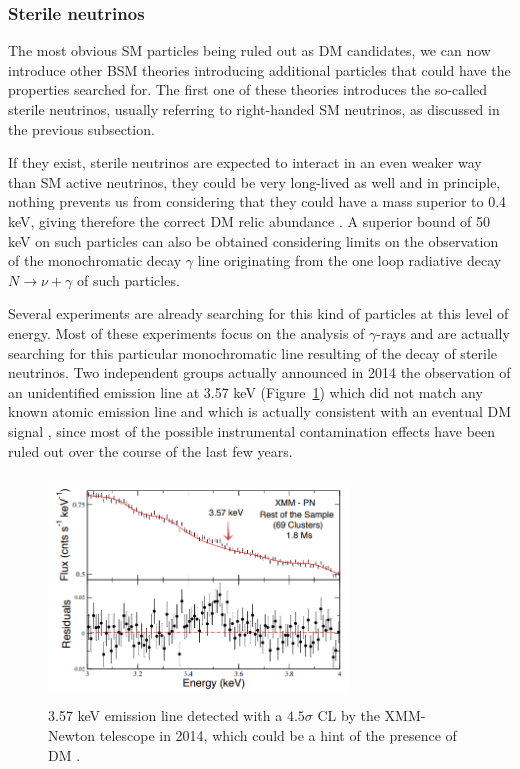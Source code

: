 \documentclass[a4paper, 10pt, openright]{report}
\begin{document}
\subsubsection*{Sterile neutrinos}
The most obvious \ac{SM} particles being ruled out as \ac{DM} candidates, we can now introduce other \ac{BSM} theories introducing additional particles that could have the properties searched for. The first one of these theories introduces the so-called sterile neutrinos, usually referring to right-handed \ac{SM} neutrinos, as discussed in the previous subsection. 

If they exist, sterile neutrinos are expected to interact in an even weaker way than \ac{SM} active neutrinos, they could be very long-lived as well and in principle, nothing prevents us from considering that they could have a mass superior to 0.4 keV, giving therefore the correct \ac{DM} relic abundance \cite{keVSterile}. A superior bound of 50 keV on such particles can also be obtained considering limits on the observation of the monochromatic decay $\gamma$ line originating from the one loop radiative decay $N \rightarrow \nu + \gamma$ of such particles.

Several experiments are already searching for this kind of particles at this level of energy. Most of these experiments focus on the analysis of $\gamma$-rays and are actually searching for this particular monochromatic line resulting of the decay of sterile neutrinos. Two independent groups actually announced in 2014 the observation of an unidentified emission line at 3.57 keV (Figure~\ref{fig:DMDetection}) which did not match any known atomic emission line and which is actually consistent with an eventual \ac{DM} signal \cite{DMDetection1, DMDetection2}, since most of the possible instrumental contamination effects have been ruled out over the course of the last few years.

\begin{figure}[htbp]
\begin{center}
\includegraphics[width=8cm, height=6cm]{figs/DMDetection.png}
\caption{3.57 keV emission line detected with a $4.5 \sigma$ \ac{CL} by the XMM-Newton telescope in 2014, which could be a hint of the presence of \ac{DM} \cite{DMDetection1}.}
\label{fig:DMDetection}
\end{center}
\end{figure}
\end{document}
